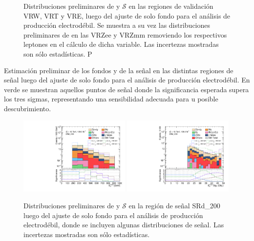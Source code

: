 \begin{figure}[ht!]
    \caption{Distribuciones preliminares de \met y $\mathcal{S}$ en las regiones de validación VRW, VRT y VRE, luego del ajuste de solo fondo para el análisis de producción electrodébil. Se muestra a su vez las distribuciones preliminares de \met en las VRZee y VRZmm removiendo los respectivos leptones en el cálculo de dicha variable. Las incertezas mostradas son sólo estadísticas. P}
    \label{fig:vr_ewk}

\end{figure}



\begin{table}[ht!]
  \centering
  \caption{Estimación preliminar de los fondos y de la señal en las distintas regiones de señal luego del ajuste de solo fondo para el análisis de producción electrodébil. En verde se muestran aquellos puntos de señal donde la significancia esperada supera los tres sigmas, representando una sensibilidad adecuada para u posible descubrimiento.}
  \resizebox{\textwidth}{!}{}
  \label{tab:fit_result_sr}
\end{table}


\begin{figure}[ht!]
  \centering

    \includegraphics[width=0.49\textwidth]{images/analysis_EWK/v192_2_nosyst/can_SRd_200_met_et_afterFit.pdf}
    \includegraphics[width=0.49\textwidth]{images/analysis_EWK/v192_2_nosyst/can_SRd_200_met_sig_obj_afterFit.pdf}

    \caption{Distribuciones preliminares de \met y $\mathcal{S}$ en la región de señal SRd\_200 luego del ajuste de solo fondo para el análisis de producción electrodébil, donde se incluyen algunas distribuciones de señal. Las incertezas mostradas son sólo estadísticas.}
    \label{fig:srd_ewk}

\end{figure}

